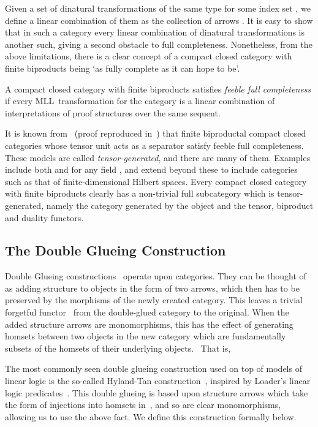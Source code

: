 \documentclass{LMCS}
\theoremstyle{plain}\newtheorem*{cLm}{Claim}
\newcommand{\mll}{MLL} \newcommand{\mall}{MALL}
\newcommand{\p}{} \newcommand{\N}{\mathbb{N}}
\newcommand{\hugh}[1]{#1}
\begin{document}
\p \hugh{Given a set of dinatural transformations of the same type  for some index set , we define a linear combination  of them as the collection of arrows .} It is easy to show that in such a category every linear combination
of dinatural transformations is another such, giving \hugh{a second} obstacle
to full completeness. Nonetheless, from the above limitations, there is a clear concept of
a compact closed category with finite biproducts being `as fully complete as it can hope to be'.

\begin{defi} \label{FeebleFCDefn}
  A compact closed category  with finite biproducts satisfies
  \emph{feeble full completeness} if every \mll\ transformation
  for the category is a linear combination of interpretations of
  proof structures over the same sequent.
\end{defi}

\p It is known from~\cite{CHS01} (proof reproduced in~\cite{Ste13}) that finite biproductal compact
closed categories whose tensor unit acts as a separator satisfy
feeble full completeness. These models are called
\emph{tensor-generated}, and there are many of them. Examples include
both  and  for any field
, and extend beyond these to include categories such as
that of finite-dimensional Hilbert spaces. Every compact closed
category with finite biproducts clearly has a non-trivial full
subcategory which is tensor-generated, namely the category generated
by the object  and the tensor, biproduct and duality functors.

\subsection{The Double Glueing Construction} \label{SectionDGlueing}

Double Glueing constructions~\cite{HS03} operate upon categories. They can be thought of as adding structure to objects in the form of two arrows, which then has to be preserved by the morphisms of the newly created category. This leaves a trivial forgetful functor~ from the double-glued category to the original. When the added structure arrows are monomorphisms, this has the effect of generating homsets between two objects in the new category which are fundamentally subsets of the homsets of their underlying objects.~\cite{Ste13} That is,


\p The most commonly seen double glueing construction used on top of models of linear logic is the so-called Hyland-Tan construction~\cite{Tan97}, inspired by Loader's linear logic predicates~\cite{Loa94b}. This double glueing is based upon structure arrows which take the form of injections into homsets in~, and so are clear monomorphisms, allowing us to use the above fact. We define this construction formally below.
\end{document}
